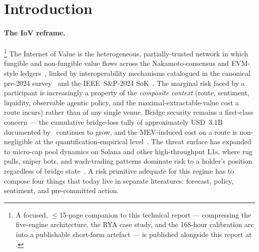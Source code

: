 \documentclass[11pt,a4paper]{article}
\begin{document}
\begin{abstract}
anchored on Subtensor EVM (chain~ID~945)~\cite{opentensor2024evm} as the verification
substrate. We formalise the route, risk-score, and validator-loss primitives, specify
the miner and validator protocols, situate the design against the cross-chain bridge
security, decentralised-ML, financial-NLP, and tabletop-exercise
literatures~\cite{augusto2024sok,zhang2023sok,wu2025safeguarding,conway2024opml,
ganescu2024trust}, and instrument a fully-public five-hour case study --- the
2026-05-06 \textsc{RYA} liquidity-defence cycle --- in which the scenario engine ran
in production as a rule-based liquidity-support program on a single Solana micro-cap
pool. The case study is honest about its scope: a single 5-hour cycle, on a single
pool, with the agentic engine instantiated as a deterministic policy rather than as
an LLM-mediated one. The LLM-mediated agentic engine and the integrated subnet remain
the next-step build, against the falsifiable hypotheses H1 and H2 stated below.
\end{abstract}

\section{Introduction}\label{sec:intro}

\paragraph{The IoV reframe.}\footnote{A focused, $\leq$15-page companion to
this technical report --- compressing the five-engine architecture, the
RYA case study, and the 168-hour calibration arc into a publishable
short-form artefact --- is published alongside this report at
.}
The Internet of Value is the heterogeneous,
partially-trusted network in which fungible and non-fungible value flows across the
Nakamoto-consensus and EVM-style ledgers~\cite{nakamoto2008bitcoin,wood2014ethereum},
linked by interoperability mechanisms catalogued in the canonical pre-2024
survey~\cite{belchior2021survey} and the IEEE~S\&P-2024
SoK~\cite{augusto2024sok}. The marginal risk faced by a participant is increasingly a
property of the \emph{composite context} (route, sentiment, liquidity, observable
agentic policy, and the maximal-extractable-value cost a route incurs) rather than of
any single venue. Bridge security remains a first-class concern --- the cumulative
bridge-loss tally of approximately USD~3.1B documented by~\cite{augusto2024sok}
continues to grow, and the MEV-induced cost on a route is non-negligible at the
quantification-empirical level~\cite{daian2020flash,qin2022quantifying}. The threat
surface has expanded to micro-cap pool dynamics on Solana and other high-throughput
L1s, where rug pulls, sniper bots, and wash-trading patterns dominate risk to a
holder's position regardless of bridge state~\cite{cernera2023token,cong2022crypto}.
A risk primitive adequate for this regime has to compose four things that today live
in separate literatures: forecast, policy, sentiment, and pre-committed action.
\end{document}
